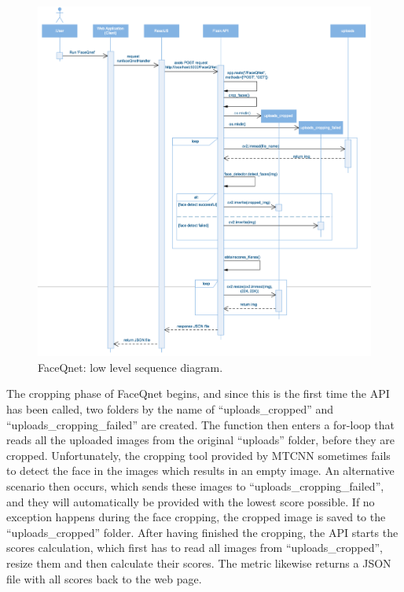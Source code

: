 \begin{figure}[h]
    \centering
    \includegraphics[width=1\textwidth]{figures/FerdigLowLevel.png}
    \caption{FaceQnet: low level sequence diagram.}
    \label{fig:lowlevel}
\end{figure}

The cropping phase of FaceQnet begins, and since this is the first time the API has been called, two folders by the name of ``uploads\_cropped'' and ``uploads\_cropping\_failed'' are created. The function then enters a for-loop that reads all the uploaded images from the original ``uploads'' folder, before they are cropped. Unfortunately, the cropping tool provided by MTCNN sometimes fails to detect the face in the images which results in an empty image. An alternative scenario then occurs, which sends these images to ``uploads\_cropping\_failed'', and they will automatically be provided with the lowest score possible. If no exception happens during the face cropping, the cropped image is saved to the ``uploads\_cropped'' folder. After having finished the cropping, the API starts the scores calculation, which first has to read all images from ``uploads\_cropped'', resize them and then calculate their scores. The metric likewise returns a JSON file with all scores back to the web page.

